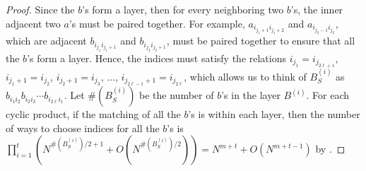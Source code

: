 \documentclass[11pt,reqno]{amsart}
\numberwithin{equation}{section}
\theoremstyle{plain}
\begin{document}
\begin{proof}
Since the $b$'s form a layer, then for every neighboring two $b$'s, the inner adjacent two $a$'s must be paired together. For example, $a_{i_{j_1+1}i_{j_1+2}}$ and $a_{i_{j_2-1}i_{j_2}}$, which are adjacent $b_{i_{j_1}i_{j_1+1}}$ and $b_{i_{j_2}i_{j_2+1}}$, must be paired together to ensure that all the $b$'s form a layer. Hence, the indices must satisfy the relations $i_{j_1}=i_{j_{2\ell+1}}$, $i_{j_1+1}=i_{j_2}$, $i_{j_2+1}=i_{j_3}$, $\dots$, $i_{j_{2\ell-1}+1}=i_{j_{2\ell}}$, which allows us to think of $B^{(i)}_S$ as $b_{i_1i_2}b_{i_2i_3}\cdots b_{i_{2\ell}i_1}$. Let $\#(B^{(i)}_S)$ be the number of $b$'s in the layer $B^{(i)}$. For each cyclic product, if the matching of all the $b$'s is within each layer, then the number of ways to choose indices for all the $b$'s is $\prod_{i=1}^t (N^{\#(B^{(i)}_{S})/2+1}+O(N^{\#(B^{(i)}_S)/2}))=N^{m+t}+O(N^{m+t-1})$ by \cite{palindromicToeplitz}.



\end{proof}
\end{document}
